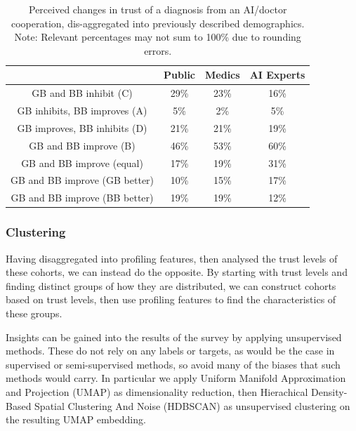 \documentclass[manuscript,screen,review]{acmart}
\begin{document}
\begin{table}[h]
\begin{tabular}{c||c|c|c}
     & Public & Medics & AI Experts \\
     \hline \hline
    GB and BB inhibit (C)            & 29\% & 23\% & 16\%\\ \hline
    GB inhibits, BB improves (A)     & 5\%  & 2\%  & 5\% \\
    GB improves, BB inhibits (D)     & 21\% & 21\% & 19\%\\  \hline
    GB and BB improve (B)      & 46\% & 53\% & 60\%\\ \hline
    GB and BB improve (equal)    & 17\% & 19\% & 31\%\\
    GB and BB improve (GB better)& 10\% & 15\% & 17\%\\
    GB and BB improve (BB better)& 19\% & 19\% & 12\%\\ 
\end{tabular}
\caption{\label{tab:demographic_trust_change}Perceived changes in trust of a diagnosis from an AI/doctor cooperation, dis-aggregated into previously described demographics. Note: Relevant percentages may not sum to 100\% due to rounding errors.}
\end{table}

\subsubsection{Clustering}

Having disaggregated into profiling features, then analysed the trust levels of these cohorts, we can instead do the opposite. By starting with trust levels and finding distinct groups of how they are distributed, we can construct cohorts based on trust levels, then use profiling features to find the characteristics of these groups.

Insights can be gained into the results of the survey by applying unsupervised methods. These do not rely on any labels or targets, as would be the case in supervised or semi-supervised methods, so avoid many of the biases that such methods would carry. In particular we apply Uniform Manifold Approximation and Projection (UMAP) \cite{McInnes2018} as dimensionality reduction, then Hierachical Density-Based Spatial Clustering And Noise (HDBSCAN) \cite{McInnes2017} as unsupervised clustering on the resulting UMAP embedding. 
\end{document}
